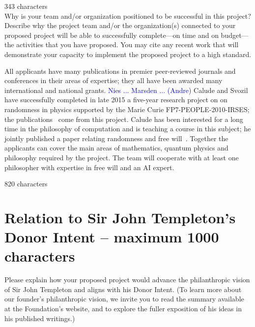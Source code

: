 \documentclass[11pt,  a4paper]{article}
\newcommand{\andre}[1]{\textcolor{blue}{#1  (Andre)}}
\begin{document}
{\color{red}  343 characters}\\

{\small \color{blue}	\noindent
Why is your team and/or organization positioned to be successful in this project? \\
 Describe why the project team and/or the organization(s) connected to your proposed project will be able to successfully complete—on time and on budget—the activities that you have proposed. You may cite any recent work that will demonstrate your capacity to implement the proposed project to a high standard.
}


All applicants have many publications in premier peer-reviewed journals and conferences in their areas of expertise; they all have been awarded many international and national grants.
\andre{Nies ... Marsden ...}
Calude and Svozil have successfully completed in late 2015 a five-year research project on on randomness in physics supported by the Marie Curie FP7-PEOPLE-2010-IRSES; the publications~\cite{2,4} come from this project.  Calude has been interested for a long time in the philosophy of computation and is teaching a course in this subject; he jointly published a paper relating randomness and free will~\cite{freewill}.
  Together the applicants can cover the main areas of mathematics, quantum physics and philosophy required by the project. The team will cooperate with at least one
 philosopher  with expertise in free will and an AI expert.


{\color{red}  820 characters}\\





\section{Relation to Sir John Templeton's Donor Intent -- maximum 1000 characters}

{\small \color{blue}\small Please explain how your proposed project would advance the philanthropic vision of Sir John Templeton and aligns with his Donor Intent. (To learn more about our founder’s philanthropic vision, we invite you to read the summary available at the Foundation’s website, and to explore the fuller exposition of his ideas in his published writings.)
\\}
\end{document}
